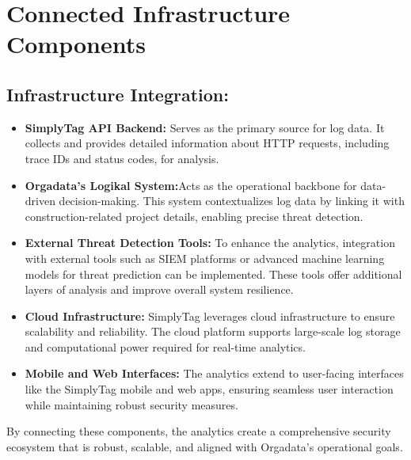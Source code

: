 %
%

\chapter{Connected Infrastructure Components}

\section{Infrastructure Integration:}

\begin{itemize}
	\item \textbf{SimplyTag API Backend:} Serves as the primary source for log data. It collects and provides detailed information about HTTP requests, including trace IDs and status codes, for analysis.
	\item \textbf{Orgadata’s Logikal System:}Acts as the operational backbone for data-driven decision-making. This system contextualizes log data by linking it with construction-related project details, enabling precise threat detection.
	\item \textbf{External Threat Detection Tools:} To enhance the analytics, integration with external tools such as SIEM platforms or advanced machine learning models for threat prediction can be implemented. These tools offer additional layers of analysis and improve overall system resilience.
	\item \textbf{Cloud Infrastructure:} SimplyTag leverages cloud infrastructure to ensure scalability and reliability. The cloud platform supports large-scale log storage and computational power required for real-time analytics.
	\item \textbf{Mobile and Web Interfaces:} The analytics extend to user-facing interfaces like the SimplyTag mobile and web apps, ensuring seamless user interaction while maintaining robust security measures.
\end{itemize}

By connecting these components, the analytics create a comprehensive security ecosystem that is robust, scalable, and aligned with Orgadata’s operational goals.
  
  
  
   
  
   

 